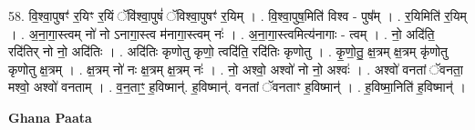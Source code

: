 \documentclass[17pt]{extarticle}
\begin{document}
58. वि॒श्वा॒पुषꣳ॑ र॒यिꣳ र॒यिं ॅवि॑श्वा॒पुषं॑ ॅविश्वा॒पुषꣳ॑ र॒यिम् । . वि॒श्वा॒पुष॒मिति॑ विश्व - पुष᳚म् । . र॒यिमिति॑ र॒यिम् । . अ॒ना॒गा॒स्त्वम् नो॑ नो ऽनागा॒स्त्व म॑नागा॒स्त्वम् नः॑ । . अ॒ना॒गा॒स्त्वमित्य॑नागाः - त्वम् । . नो॒ अदि॑ति॒ रदि॑तिर् नो नो॒ अदि॑तिः । . अदि॑तिः कृणोतु कृणो॒ त्वदि॑ति॒ रदि॑तिः कृणोतु । . कृ॒णो॒तु॒ क्ष॒त्रम् क्ष॒त्रम् कृ॑णोतु कृणोतु क्ष॒त्रम् । . क्ष॒त्रम् नो॑ नः क्ष॒त्रम् क्ष॒त्रम् नः॑ । . नो॒ अश्वो॒ अश्वो॑ नो नो॒ अश्वः॑ । . अश्वो॑ वनतां ॅवनता॒ मश्वो॒ अश्वो॑ वनताम् । . व॒न॒ताꣳ॒॒ ह॒विष्मान्॑. ह॒विष्मान्॑. वनतां ॅवनताꣳ ह॒विष्मान्॑ । . ह॒विष्मा॒निति॑ ह॒विष्मान्॑ । \newline

\textbf{Ghana Paata } \newline
\end{document}
